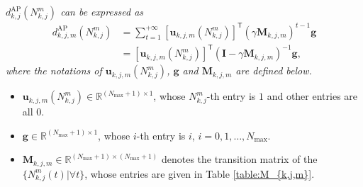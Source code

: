 \begin{lemma}
    \label{lemma:AP}\em
    ${d}_{k,j}^{\text{AP}}(N_{k,j}^m)$ can be expressed as
    \begin{align}\label{eqn:AP}
    {d}_{k,j,m}^{\text{AP}}(N_{k,j}^m)&=	\sum_{t=1}^{+\infty}[\mathbf{u}_{k,j,m}(N_{k,j}^m)]^{\mathsf{T}}(\gamma\mathbf{M}_{k,j,m})^{t-1}\mathbf{g}\nonumber\\
    &=[\mathbf{u}_{k,j,m}(N_{k,j}^m)]^{\mathsf{T}}(\mathbf{I}-\gamma\mathbf{M}_{k,j,m})^{-1}\mathbf{g},
    \end{align}
    where the notations of $\mathbf{u}_{k,j,m}(N_{k,j}^m)$, $\mathbf{g}$ and $\mathbf{M}_{k,j,m}$ are defined below.
    \begin{itemize}
        \item $\mathbf{u}_{k,j,m}(N_{k,j}^m)\in \mathbb{R}^{(N_{\max}+1)\times1}$, whose $N_{k,j}^m$-th entry is $1$ and other entries are all $0$.
        \item $\mathbf{g}\in \mathbb{R}^{(N_{\max}+1)\times1}$, whose $i$-th entry is $i$, $i=0,1,\dots,N_{\max}$.
        \item $\mathbf{M}_{k,j,m}\in \mathbb{R}^{(N_{\max}+1)\times(N_{{\max}}+1)}$ denotes the transition matrix of the $\{N_{k,j}^m(t)|\forall t\}$, whose entries are given in Table \ref{table:M_{k,j,m}}.
    \end{itemize}
\end{lemma}
